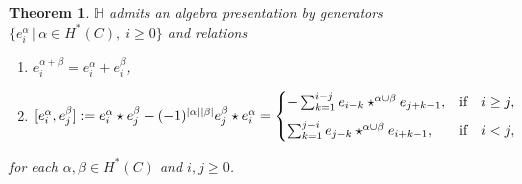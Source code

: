 \documentclass[10pt]{amsart}
\newcommand{\BH}{\mathbb{H}}
\newcommand{\+}{{}^+}
\newtheorem{theorem}{Theorem}[section]
\theoremstyle{definition}
\theoremstyle {definition}
\theoremstyle {definition}
\def\verticaldistance{6pt}
\begin{document}
\begin{theorem}\label{relations:torsioncoha}
$\BH$ admits an algebra presentation by generators $\{e^\alpha_i\,|\, \alpha\in H^*(C),\ i\geq 0\}$ and relations
\begin{enumerate}
    \item [(i)] $e^{\alpha+\beta}_i=e^\alpha_i+e^\beta_i$,
    \item [(ii)] $[e^{\alpha}_i, e^{\beta}_j ] := e^{\alpha}_i \star e^{\beta}_j - (-1)^{|\alpha| |\beta|} e^{\beta}_j \star e^{\alpha}_i =  
\begin{cases}
-\sum_{k=1}^{i-j} e_{i-k} \star^{\alpha \cup \beta} e_{j+k-1}, & \textnormal{if}\quad  i\geq j, \\[\verticaldistance] \sum_{k=1}^{j-i} e_{j-k} \star^{\alpha \cup \beta} e_{i+k-1} , & \textnormal{if}\quad  i <j,    
\end{cases} $
\end{enumerate}
for each $\alpha, \beta\in H^*(C)$ and $i, j\geq 0$.
\end{theorem}
\end{document}
